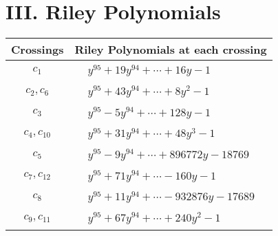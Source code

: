 \documentclass[1p]{elsarticle_modified}
\theoremstyle{definition}
\begin{document}
\centering \section*{ III. Riley Polynomials}
\begin{tabular}{m{50pt}|m{274pt}}
Crossings & \hspace{64pt}Riley Polynomials at each crossing \\
\hline $$\begin{aligned}c_{1}\end{aligned}$$&$\begin{aligned}
&y^{95}+19 y^{94}+\cdots+16 y-1
\end{aligned}$\\
\hline $$\begin{aligned}c_{2},c_{6}\end{aligned}$$&$\begin{aligned}
&y^{95}+43 y^{94}+\cdots+8 y^2-1
\end{aligned}$\\
\hline $$\begin{aligned}c_{3}\end{aligned}$$&$\begin{aligned}
&y^{95}-5 y^{94}+\cdots+128 y-1
\end{aligned}$\\
\hline $$\begin{aligned}c_{4},c_{10}\end{aligned}$$&$\begin{aligned}
&y^{95}+31 y^{94}+\cdots+48 y^3-1
\end{aligned}$\\
\hline $$\begin{aligned}c_{5}\end{aligned}$$&$\begin{aligned}
&y^{95}-9 y^{94}+\cdots+896772 y-18769
\end{aligned}$\\
\hline $$\begin{aligned}c_{7},c_{12}\end{aligned}$$&$\begin{aligned}
&y^{95}+71 y^{94}+\cdots-160 y-1
\end{aligned}$\\
\hline $$\begin{aligned}c_{8}\end{aligned}$$&$\begin{aligned}
&y^{95}+11 y^{94}+\cdots-932876 y-17689
\end{aligned}$\\
\hline $$\begin{aligned}c_{9},c_{11}\end{aligned}$$&$\begin{aligned}
&y^{95}+67 y^{94}+\cdots+240 y^2-1
\end{aligned}$\\
\hline
\end{tabular}
\vskip 2pc
\end{document}
